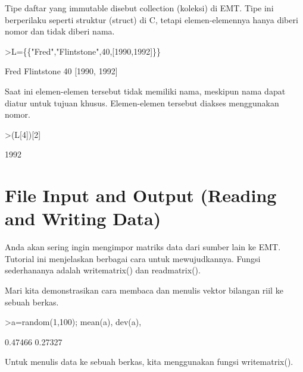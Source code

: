 \documentclass{article}
\newenvironment{eulernotebook}{\par}{\par}
\newcommand{\eulerheading}[1]{\section{#1}}
\newenvironment{eulercomment}{\par\medskip}{\par\medskip}
\begin{document}
\begin{eulernotebook}
\begin{eulercomment}
\begin{eulercomment}
\begin{eulercomment}
\begin{eulercomment}
\begin{eulercomment}
Tipe daftar yang immutable disebut collection (koleksi) di EMT. Tipe
ini berperilaku seperti struktur (struct) di C, tetapi
elemen-elemennya hanya diberi nomor dan tidak diberi nama.
\end{eulercomment}
\begin{eulerprompt}
>L=\{\{"Fred","Flintstone",40,[1990,1992]\}\}
\end{eulerprompt}
\begin{euleroutput}
  Fred
  Flintstone
  40
  [1990,  1992]
\end{euleroutput}
\begin{eulercomment}
Saat ini elemen-elemen tersebut tidak memiliki nama, meskipun nama
dapat diatur untuk tujuan khusus. Elemen-elemen tersebut diakses
menggunakan nomor.
\end{eulercomment}
\begin{eulerprompt}
>(L[4])[2]
\end{eulerprompt}
\begin{euleroutput}
  1992
\end{euleroutput}
\begin{eulercomment}
\begin{eulercomment}
\eulerheading{File Input and Output (Reading and Writing Data)}
\begin{eulercomment}
Anda akan sering ingin mengimpor matriks data dari sumber lain ke EMT.
Tutorial ini menjelaskan berbagai cara untuk mewujudkannya. Fungsi
sederhananya adalah writematrix() dan readmatrix().

Mari kita demonstrasikan cara membaca dan menulis vektor bilangan riil
ke sebuah berkas.
\end{eulercomment}
\begin{eulerprompt}
>a=random(1,100); mean(a), dev(a),
\end{eulerprompt}
\begin{euleroutput}
  0.47466
  0.27327
\end{euleroutput}
\begin{eulercomment}
Untuk menulis data ke sebuah berkas, kita menggunakan fungsi
writematrix().


\end{eulercomment}
\end{eulercomment}
\end{eulercomment}
\end{eulercomment}
\end{eulercomment}
\end{eulercomment}
\end{eulercomment}
\end{eulernotebook}
\end{document}
